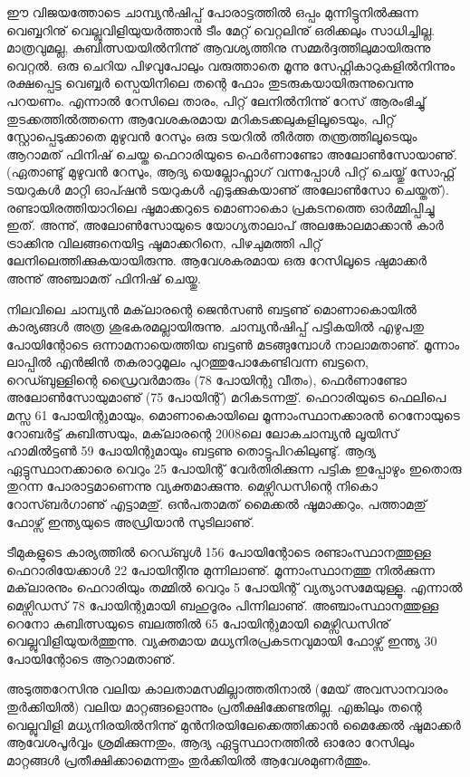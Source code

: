 ഈ വിജയത്തോടെ ചാമ്പ്യന്‍ഷിപ്പ് പോരാട്ടത്തില്‍ ഒപ്പം മുന്നിട്ടുനില്‍ക്കുന്ന വെബ്ബറിനു് 
വെല്ലുവിളിയുയര്‍ത്താന്‍ ടീം മേറ്റ് വെറ്റലിനു് ഒരിക്കലും സാധിച്ചില്ല. മാത്രവുമല്ല, കുബിത്സയയില്‍നിന്നു് ആവശ്യത്തിനു 
സമ്മര്‍ദ്ദത്തിലുമായിരുന്നു വെറ്റല്‍. ഒരു ചെറിയ പിഴവുപോലും വരുത്താതെ മൂന്നു സേഫ്റ്റികാറുകളില്‍നിന്നും രക്ഷപ്പെട്ട 
വെബ്ബര്‍ സ്പെയിനിലെ തന്റെ ഫോം തുടരുകയായിരുന്നുവെന്നു പറയണം. എന്നാല്‍ റേസിലെ താരം, പിറ്റ് ലേനില്‍നിന്നു് 
റേസ് ആരംഭിച്ചു് തുടക്കത്തില്‍ത്തന്നെ ആവേശകരമായ മറികടക്കലുകളിലൂടെയും, പിറ്റ് സ്റ്റോപ്പെടുക്കാതെ മുഴുവന്‍ റേസും 
ഒരു ടയറില്‍ തീര്‍ത്ത തന്ത്രത്തിലൂടെയും ആറാമത് ഫിനിഷ് ചെയ്ത ഫെറാരിയുടെ ഫെര്‍ണാണ്ടോ അലോണ്‍സോയാണു്. 
(ഏതാണ്ടു് മുഴുവന്‍ റേസും, ആദ്യ യെല്ലോഫ്ലാഗ് വന്നപ്പോള്‍ പിറ്റ് ചെയ്തു് സോഫ്റ്റ് ടയറുകള്‍ മാറ്റി ഓപ്ഷന്‍ ടയറുകള്‍ 
എടുക്കുകയാണു് അലോണ്‍സോ ചെയ്തത്). രണ്ടായിരത്തിയാറിലെ ഷൂമാക്കറുടെ മൊണാകൊ പ്രകടനത്തെ ഓര്‍മ്മിപ്പിച്ചു 
ഇത്. അന്നു്, അലോണ്‍സോയുടെ യോഗ്യതാലാപ് അലങ്കോലമാക്കാന്‍ കാര്‍ ട്രാക്കിനു വിലങ്ങനെയിട്ട ഷൂമാക്കറിനെ, 
പിഴചുമത്തി പിറ്റ് ലേനിലെത്തിക്കുകയായിരുന്നു. ആവേശകരമായ ഒരു റേസിലൂടെ ഷുമാക്കര്‍ അന്നു് അഞ്ചാമത് ഫിനിഷ് 
ചെയ്തു.

നിലവിലെ ചാമ്പ്യന്‍ മക്‌ലാരന്റെ ജെന്‍സണ്‍ ബട്ടണു് മൊണാകൊയില്‍ കാര്യങ്ങള്‍ അത്ര ശുഭകരമല്ലായിരുന്നു. 
ചാമ്പ്യന്‍ഷിപ്പ് പട്ടികയില്‍ എഴുപതു പോയിന്റോടെ ഒന്നാമനായെത്തിയ ബട്ടണ്‍ മടങ്ങുമ്പോള്‍ നാലാമതാണു്. മൂന്നാം 
ലാപ്പില്‍ എന്‍ജിന്‍ തകരാറുമൂലം പുറത്തുപോകേണ്ടിവന്ന ബട്ടനെ, റെഡ്ബുള്ളിന്റെ ഡ്രൈവര്‍മാരും (78 പോയിന്റു വീതം),
ഫെര്‍ണാണ്ടോ അലോണ്‍സോയുമാണു് (75 പോയിന്റ്) മറികടന്നതു്. ഫെറാരിയുടെ ഫെലിപെ മസ്സ 61 പോയിന്റുമായും, 
മൊണാകൊയിലെ മൂന്നാംസ്ഥാനക്കാരന്‍ റെനോയുടെ റോബര്‍ട്ട് കുബിത്സയും, മക്‌ലാരന്റെ 2008ലെ ലോകചാമ്പ്യന്‍ 
ലൂയിസ് ഹാമില്‍ട്ടണ്‍ 59 പോയിന്റുമായും ബട്ടണു തൊട്ടുപിറകിലുണ്ടു്. ആദ്യ ഏട്ടുസ്ഥാനക്കാരെ വെറും 25 പോയിന്റ് 
വേര്‍തിരിക്കുന്ന പട്ടിക ഇപ്പോഴും ഇതൊരു തുറന്ന പോരാട്ടമാണെന്നു വ്യക്തമാക്കുന്നു. മെഴ്സിഡസിന്റെ നികൊ 
റോസ്ബര്‍ഗാണു് എട്ടാമതു്. ഒന്‍പതാമത് മൈക്കല്‍ ഷൂമാക്കറും, പത്താമതു് ഫോഴ്സ് ഇന്ത്യയുടെ അഡ്രിയാന്‍ സുടിലാണു്.

ടീമുകളുടെ കാര്യത്തില്‍ റെഡ്ബുള്‍ 156 പോയിന്റോടെ രണ്ടാംസ്ഥാനത്തുള്ള ഫെറാരിയേക്കാള്‍ 22 പോയിന്റിനു 
മുന്നിലാണു്. മൂന്നാംസ്ഥാനത്തു നില്‍ക്കുന്ന മക്‌ലാരനും ഫെറാരിയും തമ്മില്‍ വെറും 5 പോയിന്റ് വ്യത്യാസമേയുള്ളൂ. 
എന്നാല്‍ മെഴ്സിഡസ് 78 പോയിന്റുമായി ബഹുദൂരം പിന്നിലാണു്. അഞ്ചാംസ്ഥാനത്തുള്ള റെനോ കുബിത്സയുടെ 
ബലത്തില്‍ 65 പോയിന്റുമായി മെഴ്സിഡസിനു് വെല്ലുവിളിയുയര്‍ത്തുന്നു. വ്യക്തമായ മധ്യനിരപ്രകടനവുമായി ഫോഴ്സ് 
ഇന്ത്യ 30 പോയിന്റോടെ ആറാമതാണു്.

അടുത്തറേസിനു വലിയ കാലതാമസമില്ലാത്തതിനാല്‍ (മേയ് അവസാനവാരം തുര്‍ക്കിയില്‍) വലിയ മാറ്റങ്ങളൊന്നും 
പ്രതീക്ഷിക്കേണ്ടതില്ല. എങ്കിലും തന്റെ വെല്ലുവിളി മധ്യനിരയില്‍നിന്നു് മുന്‍നിരയിലേക്കെത്തിക്കാന്‍ മൈക്കേല്‍ ഷൂമാക്കര്‍ 
ആവേശപൂര്‍വ്വം ശ്രമിക്കുന്നതും, ആദ്യ ഏട്ടുസ്ഥാനത്തില്‍ ഓരോ റേസിലും മാറ്റങ്ങള്‍ പ്രതീക്ഷിക്കാമെന്നതും തുര്‍ക്കിയില്‍ 
ആവേശമുണര്‍ത്തും.

